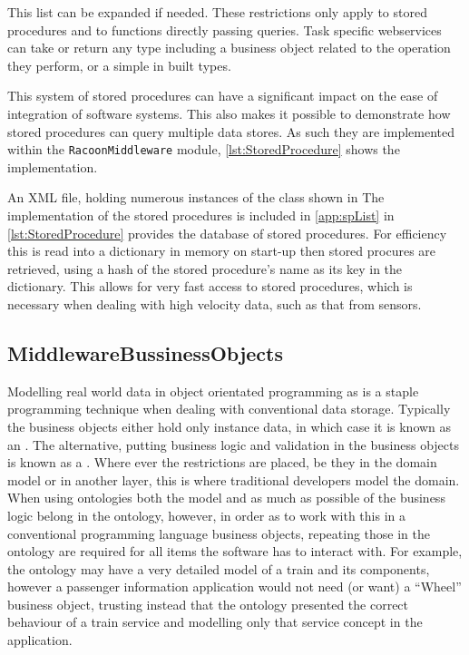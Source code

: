 This list can be expanded if needed. These restrictions only apply to stored procedures and to functions directly passing queries. Task specific webservices can take or return any type including a business object related to the operation they perform, or a simple in built types.

This system of stored procedures can have a significant impact on the ease of integration of software systems. This also makes it possible to demonstrate how stored procedures can query multiple data stores. As such they are implemented within the  \texttt{RacoonMiddleware} module, \autoref{lst:StoredProcedure} shows the implementation.

An XML file, holding numerous instances of the class shown in The implementation of the stored procedures is included in \autoref{app:spList} in \autoref{lst:StoredProcedure} provides the database of stored procedures. For efficiency this is read into a dictionary in memory on start-up then stored procures are retrieved, using a hash of the stored procedure's name as its key in the dictionary. This allows for very fast access to stored procedures, which is necessary when dealing with high velocity data, such as that from sensors.

\subsection{MiddlewareBussinessObjects}
Modelling real world data in object orientated programming as  is a staple programming technique when dealing with conventional data storage. Typically the business objects either hold only instance data, in which case it is known as an . The alternative, putting business logic and validation in the business objects is known as a . Where ever the restrictions are placed, be they in the domain model or in another layer, this is where traditional developers model the domain. When using ontologies both the model and as much as possible of the business logic belong in the ontology, however, in order as to work with this in a conventional programming language business objects, repeating those in the ontology are required for all items the software has to interact with. For example, the ontology may have a very detailed model of a train and its components, however a passenger information application would not need (or want) a ``Wheel'' business object, trusting instead that the ontology presented the correct behaviour of a train service and modelling only that service concept in the application. 

